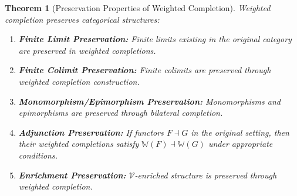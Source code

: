 \documentclass[11pt]{article}
\theoremstyle{plain}
\newtheorem{theorem}{Theorem}[section]
\theoremstyle{definition}
\theoremstyle{remark}
\newcommand{\V}{\mathcal{V}}
\begin{document}
\begin{theorem}[Preservation Properties of Weighted Completion]\label{thm:preservation-properties}
Weighted completion preserves categorical structures:

\begin{enumerate}
\item \textbf{Finite Limit Preservation:} Finite limits existing in the original category are preserved in weighted completions.

\item \textbf{Finite Colimit Preservation:} Finite colimits are preserved through weighted completion construction.

\item \textbf{Monomorphism/Epimorphism Preservation:} Monomorphisms and epimorphisms are preserved through bilateral completion.

\item \textbf{Adjunction Preservation:} If functors $F \dashv G$ in the original setting, then their weighted completions satisfy $\mathbb{W}(F) \dashv \mathbb{W}(G)$ under appropriate conditions.

\item \textbf{Enrichment Preservation:} $\V$-enriched structure is preserved through weighted completion.
\end{enumerate}
\end{theorem}
\end{document}
